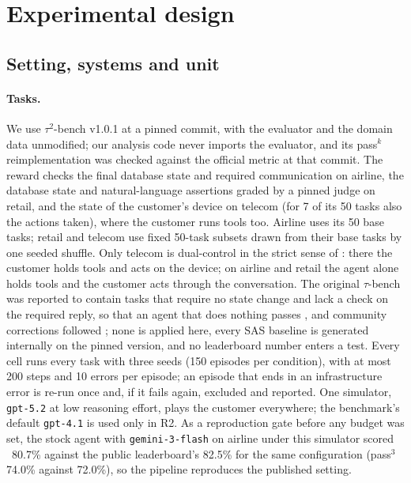 \section{Experimental design}
\label{sec:design}

\subsection{Setting, systems and unit}
\label{sec:setting}
\label{sec:systems}

\paragraph{Tasks.} We use $\tau^2$-bench v1.0.1 \citep{barres2025tau2} at a pinned commit, with the evaluator and the domain data unmodified; our analysis code never imports the evaluator, and its pass$^k$ reimplementation was checked against the official metric at that commit. The reward checks the final database state and required communication on airline, the database state and natural-language assertions graded by a pinned judge on retail, and the state of the customer's device on telecom (for 7 of its 50 tasks also the actions taken), where the customer runs tools too. Airline uses its 50 base tasks; retail and telecom use fixed 50-task subsets drawn from their base tasks by one seeded shuffle. Only telecom is dual-control in the strict sense of \citet{barres2025tau2}: there the customer holds tools and acts on the device; on airline and retail the agent alone holds tools and the customer acts through the conversation. The original $\tau$-bench was reported to contain tasks that require no state change and lack a check on the required reply, so that an agent that does nothing passes \citep{zhu2025rigorous}, and community corrections followed \citep{cuadron2025saber}; none is applied here, every SAS baseline is generated internally on the pinned version, and no leaderboard number enters a test. Every cell runs every task with three seeds (150 episodes per condition), with at most 200 steps and 10 errors per episode; an episode that ends in an infrastructure error is re-run once and, if it fails again, excluded and reported. One simulator, \texttt{gpt-5.2} at low reasoning effort, plays the customer everywhere; the benchmark's default \texttt{gpt-4.1} is used only in R2. As a reproduction gate before any budget was set, the stock agent with \texttt{gemini-3-flash} on airline under this simulator scored \passone\ 80.7\% against the public leaderboard's 82.5\% for the same configuration (pass$^3$ 74.0\% against 72.0\%), so the pipeline reproduces the published setting.

